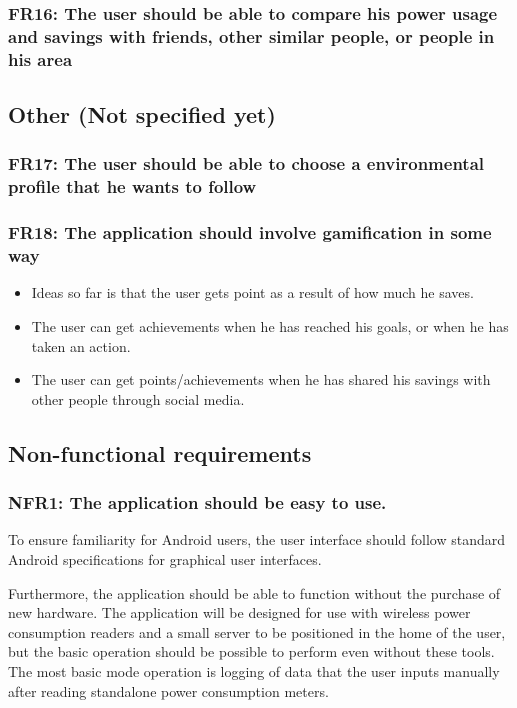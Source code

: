 \subsubsection{FR16: The user should be able to compare his power usage and savings with friends, other similar people, or people in his area}

\subsection{Other (Not specified yet)}
\subsubsection{FR17: The user should be able to choose a environmental profile that he wants to follow}
\subsubsection{FR18: The application should involve gamification in some way}
\begin{itemize}
\item Ideas so far is that the user gets point as a result of how much he saves.
\item The user can get achievements when he has reached his goals, or when he has taken an action.
\item The user can get points/achievements when he has shared his savings with other people through social media.
\end{itemize}


\subsection{Non-functional requirements}

\subsubsection{NFR1: The application should be easy to use.}
To ensure familiarity for Android users, the user interface should follow standard Android specifications for graphical user interfaces.
 
Furthermore, the application should be able to function without the purchase of new hardware. The application will be designed for use with wireless power consumption readers and a small server to be positioned in the home of the user, but the basic operation should be possible to perform even without these tools. The most basic mode operation is logging of data that 
the user inputs manually after reading standalone power consumption meters.
 

